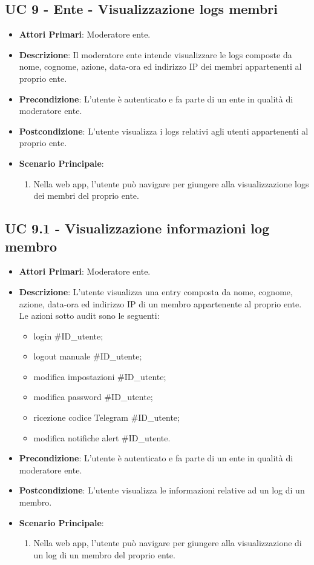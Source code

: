 		\subsection{UC 9 - Ente - Visualizzazione logs membri}
		\begin{itemize}
			\item \textbf{Attori Primari}: Moderatore ente.
			\item \textbf{Descrizione}: Il moderatore ente intende visualizzare le logs composte da nome, cognome, azione, data-ora ed indirizzo IP dei membri appartenenti al proprio ente.
			\item \textbf{Precondizione}: L'utente è autenticato e fa parte di un ente in qualità di moderatore ente.
			\item \textbf{Postcondizione}: L'utente visualizza i logs relativi agli utenti appartenenti al proprio ente.
			\item \textbf{Scenario Principale}:
			\begin{enumerate}
				\item Nella web app, l'utente può navigare per giungere alla visualizzazione logs dei membri del proprio ente.
			\end{enumerate}	
		\end{itemize}

		\subsection{UC 9.1 - Visualizzazione informazioni log membro}
			\begin{itemize}
			\item \textbf{Attori Primari}: Moderatore ente.
			\item \textbf{Descrizione}: L'utente visualizza una entry composta da nome, cognome, azione, data-ora ed indirizzo IP di un membro appartenente al proprio ente. Le azioni sotto audit sono le seguenti: 
			\begin{itemize}
				\item login #ID_utente;
				\item logout manuale #ID_utente;
				\item modifica impostazioni #ID_utente;
				\item modifica password #ID_utente;
				\item ricezione codice Telegram #ID_utente;
				\item modifica notifiche alert #ID_utente.
			\end{itemize}
			\item \textbf{Precondizione}: L'utente è autenticato e fa parte di un ente in qualità di moderatore ente.
			\item \textbf{Postcondizione}: L'utente visualizza le informazioni relative ad un log di un membro.
			\item \textbf{Scenario Principale}:
			\begin{enumerate}
				\item Nella web app, l'utente può navigare per giungere alla visualizzazione di un log di un membro del proprio ente.
			\end{enumerate}	
		\end{itemize}

